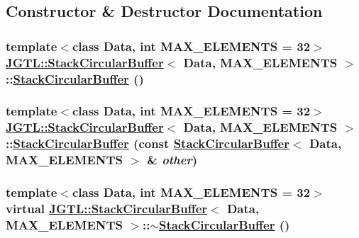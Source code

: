 \subsection{Constructor \& Destructor Documentation}
\hypertarget{class_j_g_t_l_1_1_stack_circular_buffer_7c4eab48cf58e51095ae649a2ca1ac80}{
\subsubsection[StackCircularBuffer]{\setlength{\rightskip}{0pt plus 5cm}template$<$class Data, int MAX\_\-ELEMENTS = 32$>$ \hyperlink{class_j_g_t_l_1_1_stack_circular_buffer}{JGTL::Stack\-Circular\-Buffer}$<$ Data, MAX\_\-ELEMENTS $>$::\hyperlink{class_j_g_t_l_1_1_stack_circular_buffer}{Stack\-Circular\-Buffer} ()}}
\label{class_j_g_t_l_1_1_stack_circular_buffer_7c4eab48cf58e51095ae649a2ca1ac80}


\hypertarget{class_j_g_t_l_1_1_stack_circular_buffer_5446118506dc4721fcb96a6ede231c26}{
\subsubsection[StackCircularBuffer]{\setlength{\rightskip}{0pt plus 5cm}template$<$class Data, int MAX\_\-ELEMENTS = 32$>$ \hyperlink{class_j_g_t_l_1_1_stack_circular_buffer}{JGTL::Stack\-Circular\-Buffer}$<$ Data, MAX\_\-ELEMENTS $>$::\hyperlink{class_j_g_t_l_1_1_stack_circular_buffer}{Stack\-Circular\-Buffer} (const \hyperlink{class_j_g_t_l_1_1_stack_circular_buffer}{Stack\-Circular\-Buffer}$<$ Data, MAX\_\-ELEMENTS $>$ \& {\em other})}}
\label{class_j_g_t_l_1_1_stack_circular_buffer_5446118506dc4721fcb96a6ede231c26}


\hypertarget{class_j_g_t_l_1_1_stack_circular_buffer_68a5c68dcf1b7d30bfc0c5b90db6fdcd}{
\subsubsection[$\sim$StackCircularBuffer]{\setlength{\rightskip}{0pt plus 5cm}template$<$class Data, int MAX\_\-ELEMENTS = 32$>$ virtual \hyperlink{class_j_g_t_l_1_1_stack_circular_buffer}{JGTL::Stack\-Circular\-Buffer}$<$ Data, MAX\_\-ELEMENTS $>$::$\sim$\hyperlink{class_j_g_t_l_1_1_stack_circular_buffer}{Stack\-Circular\-Buffer} ()}}
\label{class_j_g_t_l_1_1_stack_circular_buffer_68a5c68dcf1b7d30bfc0c5b90db6fdcd}




